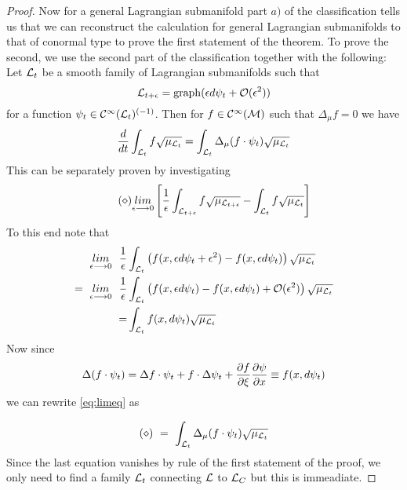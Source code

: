 \begin{theo}
\begin{proof}
  Now for a general Lagrangian submanifold part $a)$ of the classification tells us that we can reconstruct the calculation for general Lagrangian submanifolds to that of conormal type to prove the first statement of the theorem. To prove the second, we use the second part of the classification together with the following:\\

  Let $\mathcal{L}_t$ be a smooth family of Lagrangian submanifolds such that
  \begin{equation}
    \LL_{t+\epsilon} = \graph(\epsilon d\psi_t + \OO(\epsilon^2))
  \end{equation}
  for a function $\psi_t \in \mathcal{C}^{\infty}(\mathcal{L}_t)^{(-1)}$. Then for $f \in \mathcal{C}^{\infty}(\mathcal{M})$ such that $\Delta_\mu f = 0$ we have
  \begin{equation}
    \frac{d }{d t} \int_{\mathcal{L}_t} f \sqrt{\mu_{\mathcal{L}_t}} = \int_{\mathcal{L}_t} \Delta_\mu (f \cdot \psi_t) \sqrt{\mu_{\mathcal{L}_t}}
  \end{equation}
  This can be separately proven by investigating
  \begin{equation}\tag{$\diamond$} \label{eq:limeq}
    \limit{\epsilon \lra 0} \left[ \frac{1}{\epsilon} \int_{\LL_{t + \epsilon}} f \sqrt{\mu_{\LL_{t + \epsilon}}} - \int_{\LL_{t}} f \sqrt{\mu_{\LL_{t}}} \right]
  \end{equation}
  To this end note that
  \begin{align}
    \limit{\epsilon \lra 0} \ \ \frac{1}{\epsilon} &\int_{\LL_{t}} \left( f(x, \epsilon d\psi_t + \epsilon^2) - f(x, \epsilon d\psi_t) \right) \sqrt{\mu_{\LL_{t}}} \\
    = \ \limit{\epsilon \lra 0} \ \ \frac{1}{\epsilon} &\int_{\LL_{t}} \left( f(x, \epsilon d\psi_t) - f(x, \epsilon d\psi_t) + \OO(\epsilon^2) \right) \sqrt{\mu_{\LL_{t}}} \\
    = &\int_{\LL_{t}} f(x, d\psi_t) \sqrt{\mu_{\LL_{t}}} \\
  \end{align}
  Now since
  \begin{align}
    \Delta(f \cdot \psi_t) = \Delta f \cdot \psi_t + f \cdot \Delta \psi_t + \frac{\partial f}{\partial \xi} \frac{\partial \psi}{\partial x} \equiv f(x, d\psi_t)
  \end{align}
  we can rewrite \eqref{eq:limeq} as

  \begin{equation}
    (\diamond) \ = \ \int_{\mathcal{L}_{t}} \Delta_\mu (f \cdot \psi_t) \sqrt{\mu_{\mathcal{L}_{t}}}
  \end{equation}
  Since the last equation vanishes by rule of the first statement of the proof, we only need to find a family $\mathcal{L}_t$ connecting $\mathcal{L}$ to $\mathcal{L}_C$ but this is immeadiate.
\end{proof}
\end{theo}

